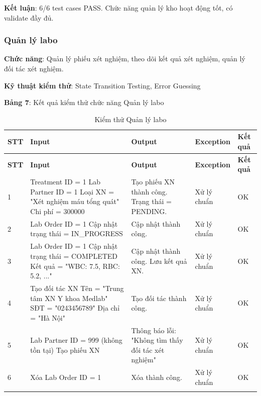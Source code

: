 \textbf{Kết luận}: 6/6 test cases PASS. Chức năng quản lý kho hoạt động tốt, có validate đầy đủ.

\subsubsection{Quản lý labo}

\textbf{Chức năng}: Quản lý phiếu xét nghiệm, theo dõi kết quả xét nghiệm, quản lý đối tác xét nghiệm.

\textbf{Kỹ thuật kiểm thử}: State Transition Testing, Error Guessing

\textbf{Bảng 7}: Kết quả kiểm thử chức năng Quản lý labo

\begin{longtable}{|p{1cm}|p{5cm}|p{4cm}|p{3cm}|p{1.5cm}|}
\hline
\textbf{STT} & \textbf{Input} & \textbf{Output} & \textbf{Exception} & \textbf{Kết quả} \\
\hline
\endfirsthead

\hline
\textbf{STT} & \textbf{Input} & \textbf{Output} & \textbf{Exception} & \textbf{Kết quả} \\
\hline
\endhead

\hline
\endfoot

1 & Treatment ID = 1 \newline Lab Partner ID = 1 \newline Loại XN = "Xét nghiệm máu tổng quát" \newline Chi phí = 300000 & Tạo phiếu XN thành công. Trạng thái = PENDING. & Xử lý chuẩn & OK \\
\hline

2 & Lab Order ID = 1 \newline Cập nhật trạng thái = IN\_PROGRESS & Cập nhật thành công. & Xử lý chuẩn & OK \\
\hline

3 & Lab Order ID = 1 \newline Cập nhật trạng thái = COMPLETED \newline Kết quả = "WBC: 7.5, RBC: 5.2, ..." & Cập nhật thành công. Lưu kết quả XN. & Xử lý chuẩn & OK \\
\hline

4 & Tạo đối tác XN \newline Tên = "Trung tâm XN Y khoa Medlab" \newline SĐT = "0243456789" \newline Địa chỉ = "Hà Nội" & Tạo đối tác thành công. & Xử lý chuẩn & OK \\
\hline

5 & Lab Partner ID = 999 (không tồn tại) \newline Tạo phiếu XN & Thông báo lỗi: "Không tìm thấy đối tác xét nghiệm" & Xử lý chuẩn & OK \\
\hline

6 & Xóa Lab Order ID = 1 & Xóa thành công. & Xử lý chuẩn & OK \\
\hline

\caption{Kiểm thử Quản lý labo}
\end{longtable}

